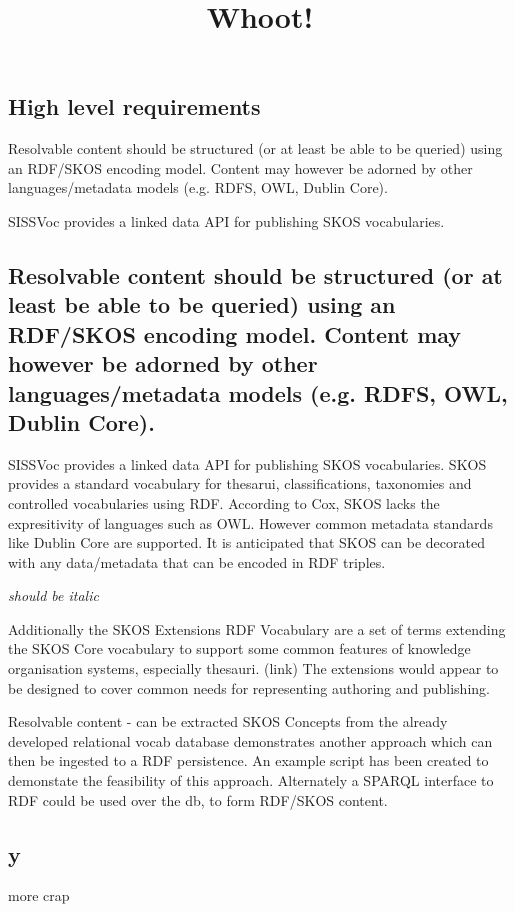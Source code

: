 \documentclass[10pt,a4paper]{article}
\title{Whoot!}
\date{}
\begin{document}
  \maketitle
    \begin{flushleft}
  \setlength{\parindent}{5ex}



\section{High level requirements}


\begin{subsection}{Resolvable content should be structured (or at least be able to be queried)
  using an RDF/SKOS encoding model. Content may however be adorned by other
  languages/metadata models (e.g. RDFS, OWL, Dublin Core).  }


	SISSVoc provides a linked data API for publishing SKOS vocabularies.
 
\end{subsection}

\subsection{Resolvable content should be structured (or at least be able to be queried)
  using an RDF/SKOS encoding model. Content may however be adorned by other
  languages/metadata models (e.g. RDFS, OWL, Dublin Core).  }


	SISSVoc provides a linked data API for publishing SKOS vocabularies.
  SKOS provides a standard vocabulary for thesarui, classifications, taxonomies
  and controlled vocabularies using RDF.
   According to Cox, SKOS lacks the expresitivity of languages such as OWL.
  However common metadata standards like Dublin Core are supported.
    It is anticipated that SKOS can be decorated with any data/metadata that can
  be encoded in RDF triples.

  \textit{should be italic}

	Additionally the SKOS Extensions RDF Vocabulary are a set of terms extending
	the SKOS Core vocabulary to support some common features of knowledge
	organisation systems, especially thesauri. (link) The extensions would appear
	to be designed to cover common needs for representing authoring and publishing.

	Resolvable content - can be extracted SKOS Concepts from the already developed
	relational vocab database demonstrates another approach which can then be
	ingested to a RDF persistence. An example script has been created to demonstate
	the feasibility of this approach. Alternately a SPARQL interface to RDF could
	be used over the db, to form RDF/SKOS content.


\subsection{y}
  more crap






  \end{flushleft}
\end{document}
